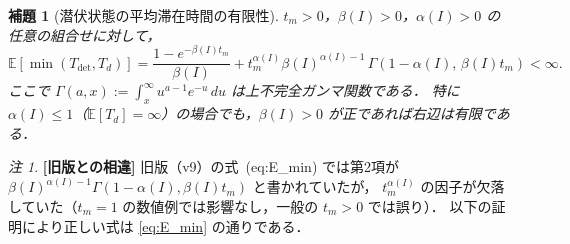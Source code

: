 \documentclass[12pt,a4paper]{article}
\theoremstyle{plain}
\newtheorem{lemma}[theorem]{補題}
\theoremstyle{definition}
\theoremstyle{remark}
\newtheorem{remark}[theorem]{注}
\newcommand{\E}{\mathbb{E}}
\newcommand{\Tdet}{T_{\mathrm{det}}}
\newcommand{\betaI}{\beta(I)}
\newcommand{\alphI}{\alpha(I)}
\begin{document}
\begin{lemma}[潜伏状態の平均滞在時間の有限性]\label{lem:sojourn}
$t_m>0$，$\betaI>0$，$\alphI>0$ の任意の組合せに対して，
\begin{equation}\label{eq:E_min}
\E[\min(\Tdet,T_d)]
=\frac{1-e^{-\betaI t_m}}{\betaI}
+t_m^{\alphI}\betaI^{\alphI-1}\,\Gamma(1-\alphI,\,\betaI t_m)<\infty.
\end{equation}
ここで $\Gamma(a,x):=\int_x^\infty u^{a-1}e^{-u}\,du$ は上不完全ガンマ関数である．
特に $\alphI\le1$（$\E[T_d]=\infty$）の場合でも，$\betaI>0$ が正であれば右辺は有限である．
\end{lemma}

\begin{remark}
\textbf{[旧版との相違]} 旧版（v9）の式~(eq:E\_min) では第2項が
$\betaI^{\alphI-1}\Gamma(1-\alphI,\betaI t_m)$ と書かれていたが，
$t_m^{\alphI}$ の因子が欠落していた（$t_m=1$ の数値例では影響なし，一般の $t_m>0$ では誤り）．
以下の証明により正しい式は \eqref{eq:E_min} の通りである．
\end{remark}
\end{document}
